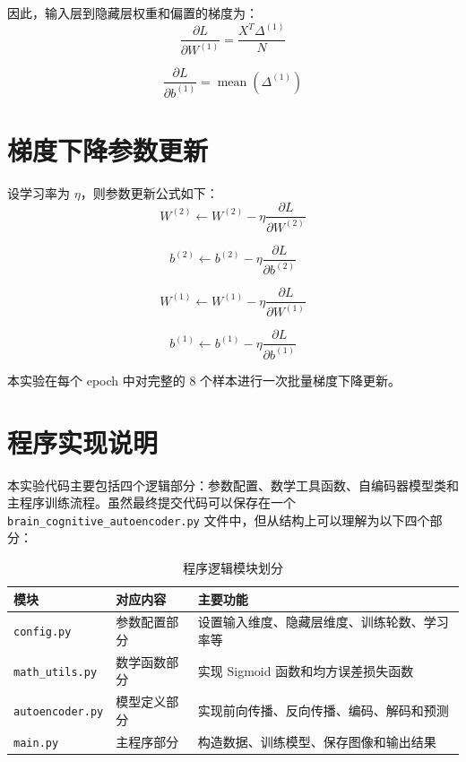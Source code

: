 \documentclass[UTF8,a4paper,12pt]{ctexart}
\begin{document}
因此，输入层到隐藏层权重和偏置的梯度为：
\begin{equation}
    \frac{\partial L}{\partial W^{(1)}} =
    \frac{X^T\Delta^{(1)}}{N}
\end{equation}

\begin{equation}
    \frac{\partial L}{\partial b^{(1)}} =
    \operatorname{mean}(\Delta^{(1)})
\end{equation}

\section{梯度下降参数更新}

设学习率为 $\eta$，则参数更新公式如下：
\begin{equation}
    W^{(2)} \leftarrow W^{(2)} - \eta \frac{\partial L}{\partial W^{(2)}}
\end{equation}

\begin{equation}
    b^{(2)} \leftarrow b^{(2)} - \eta \frac{\partial L}{\partial b^{(2)}}
\end{equation}

\begin{equation}
    W^{(1)} \leftarrow W^{(1)} - \eta \frac{\partial L}{\partial W^{(1)}}
\end{equation}

\begin{equation}
    b^{(1)} \leftarrow b^{(1)} - \eta \frac{\partial L}{\partial b^{(1)}}
\end{equation}

本实验在每个 epoch 中对完整的 $8$ 个样本进行一次批量梯度下降更新。

\section{程序实现说明}

本实验代码主要包括四个逻辑部分：参数配置、数学工具函数、自编码器模型类和主程序训练流程。虽然最终提交代码可以保存在一个 \verb|brain_cognitive_autoencoder.py| 文件中，但从结构上可以理解为以下四个部分：

\begin{table}[H]
    \centering
    \caption{程序逻辑模块划分}
    \begin{tabular}{lll}
        \toprule
        模块 & 对应内容 & 主要功能 \\
        \midrule
        \verb|config.py| & 参数配置部分 & 设置输入维度、隐藏层维度、训练轮数、学习率等 \\
        \verb|math_utils.py| & 数学函数部分 & 实现 Sigmoid 函数和均方误差损失函数 \\
        \verb|autoencoder.py| & 模型定义部分 & 实现前向传播、反向传播、编码、解码和预测 \\
        \verb|main.py| & 主程序部分 & 构造数据、训练模型、保存图像和输出结果 \\
        \bottomrule
    \end{tabular}
\end{table}
\end{document}
